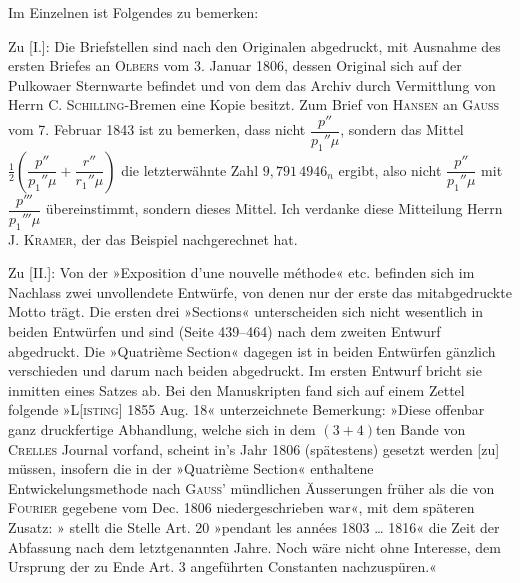 \begingroup
{}
\renewcommand{\headrulewidth}{0pt}
\par\noindent\hspace*{\parindent}Im Einzelnen ist Folgendes zu bemerken:

\par\noindent\hspace*{\parindent}Zu [I.]: Die Briefstellen sind nach den Originalen abgedruckt,
mit Ausnahme des ersten Briefes an \textsc{Olbers} vom 3. Januar 1806,
dessen Original sich auf der Pulkowaer Sternwarte befindet und von dem das
Archiv durch Vermittlung von Herrn C. \textsc{Schilling}-Bremen eine Kopie besitzt.
Zum Brief von \textsc{Hansen} an \textsc{Gauss} vom 7. Februar 1843 ist zu bemerken,
dass nicht \(\dfrac{p''}{p_1''\mu}\), sondern das Mittel
\(\frac12\left(\dfrac{p''}{p_1''\mu}+\dfrac{r''}{r_1''\mu}\right)\)
die letzterwähnte Zahl \(9{,}791\,4946_n\) ergibt, also nicht
\(\dfrac{p''}{p_1''\mu}\) mit \(\dfrac{p'''}{p_1'''\mu}\) übereinstimmt,
sondern dieses Mittel. Ich verdanke diese Mitteilung Herrn J. \textsc{Kramer},
der das Beispiel nachgerechnet hat.

\par\noindent\hspace*{\parindent}Zu [II.]: Von der »Exposition d'une nouvelle méthode« etc.
befinden sich im Nachlass zwei unvollendete Entwürfe, von denen nur der erste
das mitabgedruckte Motto trägt. Die ersten drei »Sections« unterscheiden sich
nicht wesentlich in beiden Entwürfen und sind (Seite 439--464) nach dem zweiten
Entwurf abgedruckt. Die »Quatrième Section« dagegen ist in beiden Entwürfen
gänzlich verschieden und darum nach beiden abgedruckt. Im ersten Entwurf bricht
sie inmitten eines Satzes ab. Bei den Manuskripten fand sich auf einem Zettel
folgende »L[\textsc{isting}] 1855 Aug. 18« unterzeichnete Bemerkung:
»Diese offenbar ganz druckfertige Abhandlung, welche sich in dem \((3+4)\)ten Bande
von \textsc{Crelles} Journal vorfand, scheint in's Jahr 1806 (spätestens) gesetzt
werden [zu] müssen, insofern die in der »Quatrième Section« enthaltene
Entwickelungsmethode nach \textsc{Gauss}' mündlichen Äusserungen früher als die von
\textsc{Fourier} gegebene vom Dec. 1806 niedergeschrieben war«, mit dem späteren Zusatz:
» stellt die Stelle Art. 20 »pendant les années 1803 \ldots{} 1816«
die Zeit der Abfassung nach dem letztgenannten Jahre. Noch wäre nicht ohne Interesse,
dem Ursprung der zu Ende Art. 3 angeführten Constanten nachzuspüren.«

